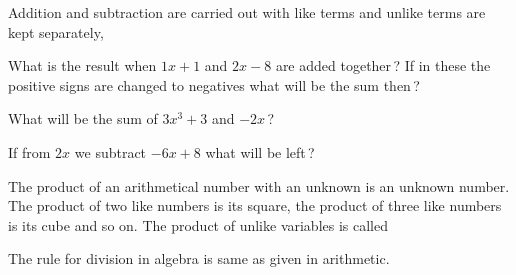 \documentclass[]{article}
\begin{document}
{{\begin{quote}  {
}  \end{quote}
\newpage
\large

{Addition and subtraction are carried out with like terms and unlike
terms are kept separately,}

\begin{quote}  {
}  \end{quote}

{What is the result when $1x + 1$ and $2x - 8$ are added together\,? If in
these the positive signs are changed to negatives what will be the sum
then\,?}

\begin{quote}  {
}  \end{quote}

{What will be the sum of $3x^3 + 3$ and $-2x$\,? }

\begin{quote}  {  }
\end{quote}
\vspace{-4mm}

{If from $2x$ we subtract $-6x + 8$ what will be left\,?}

\begin{quote}  {
}  \end{quote}

{The product of an arithmetical number with an unknown is an unknown
number. The product of two like numbers is its square, the product of
three like numbers is its cube and so on. The product of unlike
variables is called {}

{The rule for division in algebra is same as given in arithmetic.}

}}}
\end{document}
